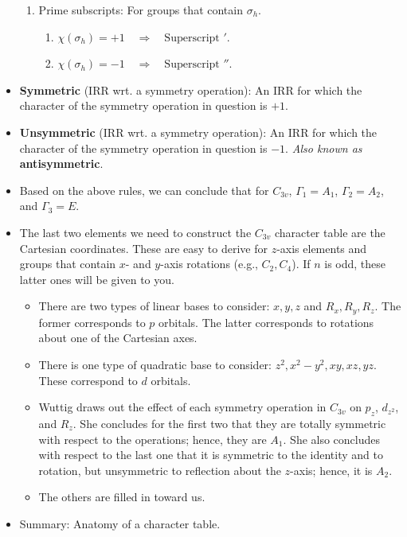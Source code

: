 \documentclass[../notes.tex]{subfiles}
\begin{document}
\begin{itemize}
\begin{enumerate}
        \item Prime subscripts: For groups that contain $\sigma_h$.
        \begin{enumerate}
            \item $\chi(\sigma_h)=+1\quad\Longrightarrow\quad\text{Superscript }'$.
            \item $\chi(\sigma_h)=-1\quad\Longrightarrow\quad\text{Superscript }''$.
        \end{enumerate}
    \end{enumerate}
    \item \textbf{Symmetric} (IRR wrt. a symmetry operation): An IRR for which the character of the symmetry operation in question is $+1$.
    \item \textbf{Unsymmetric} (IRR wrt. a symmetry operation): An IRR for which the character of the symmetry operation in question is $-1$. \emph{Also known as} \textbf{antisymmetric}.
    \item Based on the above rules, we can conclude that for $C_{3v}$, $\Gamma_1=A_1$, $\Gamma_2=A_2$, and $\Gamma_3=E$.
    \item The last two elements we need to construct the $C_{3v}$ character table are the Cartesian coordinates. These are easy to derive for $z$-axis elements and groups that contain $x$- and $y$-axis rotations (e.g., $C_2,C_4$). If $n$ is odd, these latter ones will be given to you.
    \begin{itemize}
        \item There are two types of linear bases to consider: $x,y,z$ and $R_x,R_y,R_z$. The former corresponds to $p$ orbitals. The latter corresponds to rotations about one of the Cartesian axes.
        \item There is one type of quadratic base to consider: $z^2,x^2-y^2,xy,xz,yz$. These correspond to $d$ orbitals.
        \item Wuttig draws out the effect of each symmetry operation in $C_{3v}$ on $p_z$, $d_{z^2}$, and $R_z$. She concludes for the first two that they are totally symmetric with respect to the operations; hence, they are $A_1$. She also concludes with respect to the last one that it is symmetric to the identity and to rotation, but unsymmetric to reflection about the $z$-axis; hence, it is $A_2$.
        \item The others are filled in toward us.
    \end{itemize}
    \item Summary: Anatomy of a character table.
    \begin{enumerate}

\end{enumerate}
\end{itemize}
\end{document}
